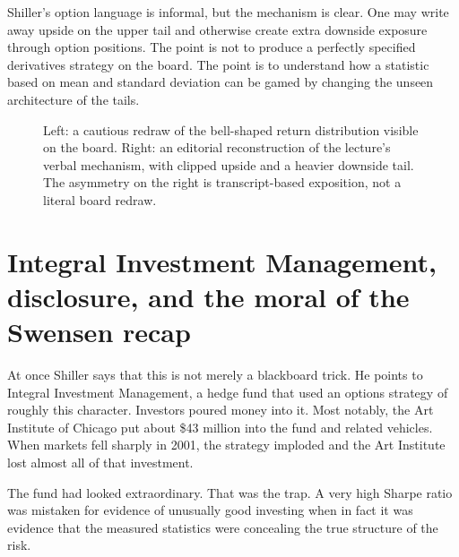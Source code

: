 Shiller's option language is informal, but the mechanism is clear. One may write away upside on the upper tail and otherwise create extra downside exposure through option positions. The point is not to produce a perfectly specified derivatives strategy on the board. The point is to understand how a statistic based on mean and standard deviation can be gamed by changing the unseen architecture of the tails.

\begin{figure}
\centering
{}
\hspace{1cm}
\caption{Left: a cautious redraw of the bell-shaped return distribution visible on the board. Right: an editorial reconstruction of the lecture's verbal mechanism, with clipped upside and a heavier downside tail. The asymmetry on the right is transcript-based exposition, not a literal board redraw.}
\end{figure}

\section{Integral Investment Management, disclosure, and the moral of the Swensen recap}

At once Shiller says that this is not merely a blackboard trick. He points to Integral Investment Management, a hedge fund that used an options strategy of roughly this character. Investors poured money into it. Most notably, the Art Institute of Chicago put about \$43 million into the fund and related vehicles. When markets fell sharply in 2001, the strategy imploded and the Art Institute lost almost all of that investment.

The fund had looked extraordinary. That was the trap. A very high Sharpe ratio was mistaken for evidence of unusually good investing when in fact it was evidence that the measured statistics were concealing the true structure of the risk.

